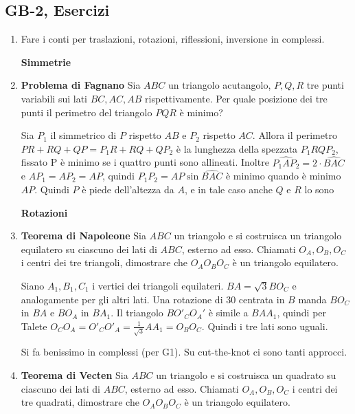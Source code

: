 \subsection{GB-2, Esercizi}
\begin{enumerate}
       \item Fare i conti per traslazioni, rotazioni, riflessioni, inversione in complessi. 
       
       \textbf{Simmetrie}

       \item \textbf{Problema di Fagnano} Sia $ABC$ un triangolo acutangolo, $P,Q,R$ tre punti variabili sui lati $BC,AC,AB$ rispettivamente. Per quale posizione dei tre punti il perimetro del triangolo $PQR$ è minimo?
       
      \begin{sol}Sia $P_1$ il simmetrico di $P$ rispetto $AB$ e $P_2$ rispetto $AC$. Allora il perimetro $PR+RQ+QP=P_1R+RQ+QP_2$ è la lunghezza della spezzata $P_1RQP_2$, fissato P è minimo se i quattro punti sono allineati. Inoltre $\widehat{P_1AP_2}=2\cdot\widehat{BAC}$ e $AP_1=AP_2=AP$, quindi $P_1P_2=AP \sin{\widehat{BAC}}$ è minimo quando è minimo $AP$. Quindi $P$ è piede dell'altezza da $A$, e in tale caso anche $Q$ e $R$ lo sono
       \end{sol}
      
       \textbf{Rotazioni}
      
       \item \textbf{Teorema di Napoleone} Sia $ABC$ un triangolo e si costruisca un triangolo equilatero su ciascuno dei lati di $ABC$, esterno ad esso. Chiamati $O_A,O_B,O_C$ i centri dei tre triangoli, dimostrare che $O_AO_BO_C$ è un triangolo equilatero.
     
      \begin{sol}Siano $A_1,B_1,C_1$ i vertici dei triangoli equilateri. $BA=\sqrt{3}BO_C$ e analogamente per gli altri lati. Una rotazione di 30 centrata in $B$ manda $BO_C$ in $BA$ e $BO_A$ in $BA_1$. Il triangolo $BO'_CO_A'$ è simile a $BAA_1$, quindi per Talete $O_CO_A=O'_CO'_A=\frac{1}{\sqrt{3}}AA_1=O_BO_C$. Quindi i tre lati sono uguali.
     
      Si fa benissimo in complessi (per G1). Su cut-the-knot ci sono tanti approcci.\cite{napoleoncomplex}
      \end{sol}
            
      \item \textbf{Teorema di Vecten } Sia $ABC$ un triangolo e si costruisca un quadrato su ciascuno dei lati di $ABC$, esterno ad esso. Chiamati $O_A,O_B,O_C$ i centri dei tre quadrati, dimostrare che $O_AO_BO_C$ è un triangolo equilatero.
      

\end{enumerate}
